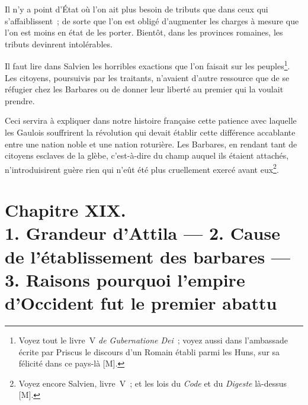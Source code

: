 \documentclass[french,twoside]{book} %
\newcommand\chapteropen{} %
\newcommand\chapterclose{} %
\begin{document}
Il n’y a point d’État où l’on ait plus besoin de tributs que dans ceux qui s’affaiblissent ; de sorte que l’on est obligé d’augmenter les charges à mesure que l’on est moins en état de les porter. Bientôt, dans les provinces romaines, les tributs devinrent intolérables.\par
Il faut lire dans Salvien les horribles exactions que l’on faisait sur les peuples\footnote{Voyez tout le livre V {\itshape de Gubernatione Dei} ; voyez aussi dans l’ambassade écrite par Priscus le discours d’un Romain établi parmi les Huns, sur sa félicité dans ce pays-là [M].}. Les citoyens, poursuivis par les traitants, n’avaient d’autre ressource que de se réfugier chez les Barbares ou de donner leur liberté au premier qui la voulait prendre.\par
Ceci servira à expliquer dans notre histoire française cette patience avec laquelle les Gaulois souffrirent la révolution qui devait établir cette différence accablante entre une nation noble et une nation roturière. Les Barbares, en rendant tant de citoyens esclaves de la glèbe, c’est-à-dire du champ auquel ils étaient attachés, n’introduisirent guère rien qui n’eût été plus cruellement exercé avant eux\footnote{Voyez encore Salvien, livre V ; et les lois du {\itshape Code} et du {\itshape Digeste} là-dessus [M].}.
\chapterclose


\chapteropen
\chapter[{Chapitre XIX. 1. Grandeur d’Attila — 2. Cause de l’établissement des barbares — 3. Raisons pourquoi l’empire d’Occident fut le premier abattu}]{Chapitre XIX. \\
1. Grandeur d’Attila — 2. Cause de l’établissement des barbares — 3. Raisons pourquoi l’empire d’Occident fut le premier abattu}
\label{considérations\_Romains\_chap\_19}\renewcommand{\leftmark}{Chapitre XIX. \\
1. Grandeur d’Attila — 2. Cause de l’établissement des barbares — 3. Raisons pourquoi l’empire d’Occident fut le premier abattu}
\end{document}

